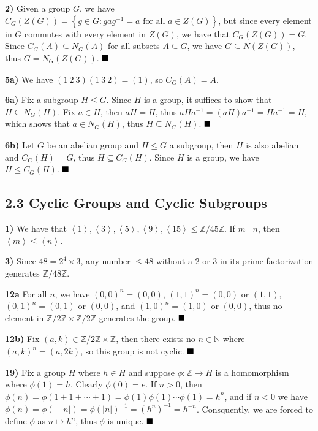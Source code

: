 \documentclass[12pt]{article}
\newcommand{\N}{\mathbb{N}}
\newcommand{\Z}{\mathbb{Z}}
\newcommand{\angleb}[1]{\left\langle#1\right\rangle}
\newcommand{\braceb}[1]{\left\{#1\right\}}
\newcommand{\vertb}[1]{\left\vert#1\right\vert}
\newcommand{\done}{\ensuremath{\strut\hfill\blacksquare}}
\begin{document}
\textbf{2)}
Given a group \( G \), we have
\(
	C_G(Z(G))
	= \braceb{
		g \in G : gag^{-1} = a \text{ for all } a \in Z(G)
	}
\),
but since every element in \( G \) commutes with every element in \( Z(G) \),
we have that \( C_G(Z(G)) = G \).
Since \( C_G(A) \subseteq N_G(A) \) for all subsets \( A \subseteq G \), we
have \( G \subseteq N(Z(G)) \), thus \( G = N_G(Z(G)) \).
\done

\textbf{5a)} We have \( (1\ 2\ 3)(1\ 3\ 2) = (1) \), so \( C_G(A) = A \).

\textbf{6a)} Fix a subgroup \( H \leq G \).
Since \( H \) is a group, it suffices to show that \( H \subseteq N_G(H) \).
Fix \( a \in H \), then \( aH = H \), thus
\( aHa^{-1} = (aH)a^{-1} = Ha^{-1} = H \), which shows that \( a \in N_G(H) \),
thus \( H \subseteq N_G(H) \).
\done

\textbf{6b)} Let \( G \) be an abelian group and \( H \leq G \) a subgroup,
then \( H \) is also abelian and \( C_G(H) = G \), thus
\( H \subseteq C_G(H) \).
Since \( H \) is a group, we have \( H \leq C_G(H) \).
\done

\pagebreak
\subsection*{2.3 Cyclic Groups and Cyclic Subgroups}

\textbf{1)} We have that
\(
	\angleb{1}, \angleb{3}, \angleb{5}, \angleb{9}, \angleb{15}
	\leq \Z / 45\Z
\).
If \( m \mid n \), then \( \angleb{m} \leq \angleb{n} \).

\textbf{3)} Since \( 48 = 2^4 \times 3\), any number \( \leq 48 \) without
a \( 2 \) or \( 3 \) in its prime factorization generates \( \Z / 48\Z \).

\textbf{12a} For all \( n \), we have \( (0, 0)^n = (0, 0) \),
\( (1, 1)^n = (0, 0) \text{ or } (1, 1) \),
\( (0, 1)^n = (0, 1) \text{ or } (0, 0) \), and
\( (1, 0)^n = (1, 0) \text{ or } (0, 0) \), thus
no element in \( \Z / 2\Z \times \Z / 2\Z \) generates the group.
\done

\textbf{12b)} Fix \( (a, k) \in \Z / 2\Z \times \Z \), then there exists no
\( n \in \N \) where \( (a, k)^n = (a, 2k) \), so this group is not cyclic.
\done

\textbf{19)} Fix a group \( H \) where \( h \in H \) and suppose
\( \phi : \Z \to H \) is a homomorphism where \( \phi(1) = h \).
Clearly \( \phi(0) = e \).
If \( n > 0 \), then
\( \phi(n) = \phi(1 + 1 + \cdots + 1) = \phi(1)\phi(1)\cdots\phi(1) = h^n \),
and if \( n < 0 \) we have
\( \phi(n) = \phi(-\vertb{n}) = \phi(\vertb{n})^{-1} = (h^n)^{-1} = h^{-n} \).
Consquently, we are forced to define \( \phi \) as \( n \mapsto h^n \), thus
\( \phi \) is unique.
\done
\end{document}

